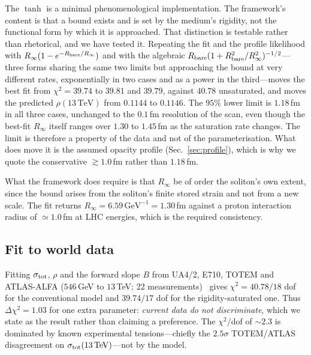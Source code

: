 \documentclass[aps,prd,preprint,nofootinbib,longbibliography]{revtex4-2}
\begin{document}
The $\tanh$ is a minimal phenomenological implementation. The framework's content
is that a bound exists and is set by the medium's rigidity, not the functional
form by which it is approached. That distinction is testable rather than
rhetorical, and we have tested it. Repeating the fit and the profile likelihood
with $R_\infty(1-e^{-R_{\rm bare}/R_\infty})$ and with the algebraic
$R_{\rm bare}(1+R_{\rm bare}^2/R_\infty^2)^{-1/2}$---three forms sharing the same
two limits but approaching the bound at very different rates, exponentially in
two cases and as a power in the third---moves the best fit from $\chi^2=39.74$ to
$39.81$ and $39.79$, against $40.78$ unsaturated, and moves the predicted
$\rho(13\,\mathrm{TeV})$ from $0.1144$ to $0.1146$. The $95\%$ lower limit is
$1.18\,$fm in all three cases, unchanged to the $0.1\,$fm resolution of the scan,
even though the best-fit $R_\infty$ itself ranges over $1.30$ to $1.45\,$fm as
the saturation rate changes. The limit is therefore a property of the data and
not of the parameterisation. What does move it is the assumed opacity profile
(Sec.~\ref{sec:profile}), which is why we quote the conservative
$\gtrsim1.0\,$fm rather than $1.18\,$fm.

What the framework does require is that
$R_\infty$ be of order the soliton's own extent, since the bound arises from the
soliton's finite stored strain and not from a new scale. The fit returns
$R_\infty=6.59\,\mathrm{GeV}^{-1}=1.30\,$fm against a proton interaction radius
of $\simeq1.0\,$fm at LHC energies, which is the required consistency.

\subsection{Fit to world data}

Fitting $\sigma_{\rm tot}$, $\rho$ and the forward slope $B$ from UA4/2, E710,
TOTEM and ATLAS-ALFA ($546\,$GeV to $13\,$TeV; 22
measurements)~\cite{ua42,e710,totem2020,atlas2014,totem2016,atlas2016,totem2019rho,atlas2023}
gives $\chi^2=40.78/18$ dof for the conventional model and $39.74/17$ dof for the
rigidity-saturated one. Thus $\Delta\chi^2=1.03$ for one extra parameter:
\emph{current data do not discriminate}, which we state as the result rather than
claiming a preference. The $\chi^2/$dof of $\sim2.3$ is dominated by known
experimental tensions---chiefly the $2.5\sigma$ TOTEM/ATLAS disagreement on
$\sigma_{\rm tot}(13\,\mathrm{TeV})$---not by the model.
\end{document}
